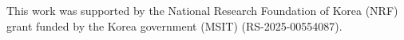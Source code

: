 \begin{credits}
\subsubsection{\ackname}

This work was supported by the National Research Foundation of Korea (NRF) grant funded by the Korea government (MSIT) (RS-2025-00554087).

\subsubsection{\discintname}

\end{credits}